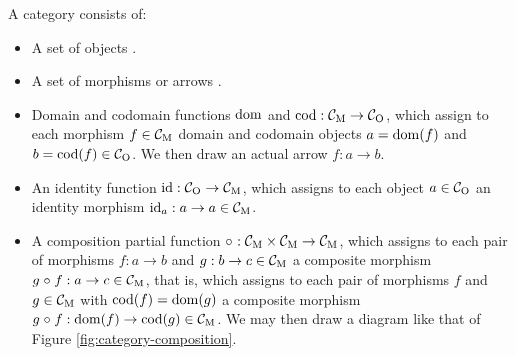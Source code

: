\begin{definition}
  [Category]



  \label{def:category}


  A category  consists of:
  \begin{itemize}
  \item

    A set of objects .

  \item

    A set of morphisms or arrows .

  \item

    Domain and codomain functions $\operatorname{dom}$ and $\operatorname{cod}: \mathcal{C}_{\operatorname{M}} \to
    \mathcal{C}_{\operatorname{O}}$, which assign to each morphism $f \in \mathcal{C}_{\operatorname{M}}$ domain
    and codomain objects $a = \operatorname{dom}(f)$ and $b = \operatorname{cod}(f) \in \mathcal{C}_{\operatorname{O}}$.
    We then draw an actual arrow $f: a \to b$.

  \item

    An identity function $\operatorname{id}: \mathcal{C}_{\operatorname{O}} \to \mathcal{C}_{\operatorname{M}}$, which assigns
    to each object $a \in \mathcal{C}_{\operatorname{O}}$ an identity morphism $\operatorname{id}_{a}: a
    \to a \in \mathcal{C}_{\operatorname{M}}$.

  \item

    A composition partial function $\comp\ : \catM{C} \times \catM{C}
    \to \catM{C}$, which assigns to each pair of morphisms $f: a \to
    b$ and $g: b \to c \in \mathcal{C}_{\operatorname{M}}$ a composite morphism $g \mathrel{\circ} f:
    a \to c \in \mathcal{C}_{\operatorname{M}}$, that is, which assigns to each pair of
    morphisms $f$ and $g \in \mathcal{C}_{\operatorname{M}}$ with $\operatorname{cod}(f) = \operatorname{dom}(g)$ a
    composite morphism $g \mathrel{\circ} f: \operatorname{dom}(f) \to \operatorname{cod}(g) \in \mathcal{C}_{\operatorname{M}}$.
    We may then draw a diagram like that of Figure
    \ref{fig:category-composition}.

    \begin{figure}[htbp]
      \begin{center}
\end{center}
\end{figure}
\end{itemize}
\end{definition}
